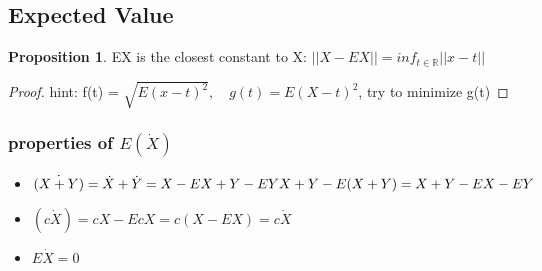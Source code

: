 \documentclass{article}
\theoremstyle{definition}
\theoremstyle{thrm}
\theoremstyle{lma}
\theoremstyle{ppst}
\newtheorem{ppst}{Proposition}[section]
\theoremstyle{crlr}
\begin{document}
\subsection{Expected Value}
\begin{ppst}
	EX is the closest constant to X: $||X-EX|| = inf_{t\in \mathbb{R}}||x-t||$
\end{ppst}
\begin{proof}
	hint: f(t) = $\sqrt{E(x-t)^2},\quad g(t) = E(X-t)^2$, try to minimize g(t)
\end{proof}
\subsubsection{properties of $E(\dot{X})$}
\begin{itemize}
	\item $\dot{(X+Y)} =\dot{X}+\dot{Y} =X-EX+Y-EY\\X+Y-E(X+Y) = X+Y-EX-EY$
	\item $(c\dot{X}) = cX-EcX = c(X-EX) = c\dot{X}$
	\item $E\dot{X} = 0$
\end{itemize}
\end{document}
